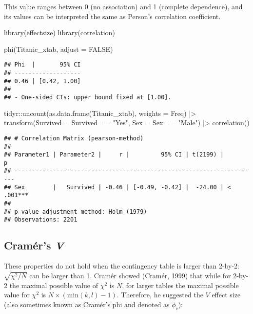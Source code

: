 \documentclass[
]{article}
\newenvironment{Shaded}{\begin{snugshade}}{\end{snugshade}}
\newcommand{\AttributeTok}[1]{\textcolor[rgb]{0.77,0.63,0.00}{#1}}
\newcommand{\ConstantTok}[1]{\textcolor[rgb]{0.00,0.00,0.00}{#1}}
\newcommand{\FunctionTok}[1]{\textcolor[rgb]{0.00,0.00,0.00}{#1}}
\newcommand{\NormalTok}[1]{#1}
\newcommand{\SpecialCharTok}[1]{\textcolor[rgb]{0.00,0.00,0.00}{#1}}
\newcommand{\StringTok}[1]{\textcolor[rgb]{0.31,0.60,0.02}{#1}}
\begin{document}
This value ranges between 0 (no association) and 1 (complete
dependence), and its values can be interpreted the same as Person's
correlation coefficient.

\begin{Shaded}
\begin{Highlighting}[]
\FunctionTok{library}\NormalTok{(effectsize)}
\FunctionTok{library}\NormalTok{(correlation)}

\FunctionTok{phi}\NormalTok{(Titanic\_xtab, }\AttributeTok{adjust =} \ConstantTok{FALSE}\NormalTok{)}
\end{Highlighting}
\end{Shaded}

\begin{verbatim}
## Phi  |       95% CI
## -------------------
## 0.46 | [0.42, 1.00]
## 
## - One-sided CIs: upper bound fixed at [1.00].
\end{verbatim}

\begin{Shaded}
\begin{Highlighting}[]
\NormalTok{tidyr}\SpecialCharTok{::}\FunctionTok{uncount}\NormalTok{(}\FunctionTok{as.data.frame}\NormalTok{(Titanic\_xtab), }\AttributeTok{weights =}\NormalTok{ Freq) }\SpecialCharTok{|\textgreater{}}
  \FunctionTok{transform}\NormalTok{(}\AttributeTok{Survived =}\NormalTok{ Survived }\SpecialCharTok{==} \StringTok{"Yes"}\NormalTok{,}
            \AttributeTok{Sex =}\NormalTok{ Sex }\SpecialCharTok{==} \StringTok{"Male"}\NormalTok{) }\SpecialCharTok{|\textgreater{}} 
  \FunctionTok{correlation}\NormalTok{()}
\end{Highlighting}
\end{Shaded}

\begin{verbatim}
## # Correlation Matrix (pearson-method)
## 
## Parameter1 | Parameter2 |     r |         95% CI | t(2199) |         p
## ----------------------------------------------------------------------
## Sex        |   Survived | -0.46 | [-0.49, -0.42] |  -24.00 | < .001***
## 
## p-value adjustment method: Holm (1979)
## Observations: 2201
\end{verbatim}

\hypertarget{cramuxe9rs-v}{%
\subsection{\texorpdfstring{Cramér's
\emph{V}}{Cramér's V}}\label{cramuxe9rs-v}}

These properties do not hold when the contingency table is larger than
2-by-2: \(\sqrt{\chi^2/N}\) can be larger than 1. Cramér showed (Cramér,
1999) that while for 2-by-2 the maximal possible value of \(\chi^2\) is
\(N\), for larger tables the maximal possible value for \(\chi^2\) is
\(N\times (\text{min}(k,l)-1)\). Therefore, he suggested the \(V\)
effect size (also sometimes known as Cramér's phi and denoted as
\(\phi_{c}\)):
\end{document}
